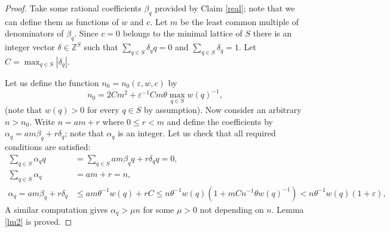 \documentclass[10pt,a4paper]{amsart}
\newcommand{\Z}{\mathbb Z}
\renewcommand{\le}{\leqslant}
\begin{document}
\begin{proof}
Take some rational coefficients $\beta_q$ provided by Claim \ref{real}; note that we can define them as functions of $w$ and $c$. Let $m$ be the least common multiple of denominators of $\beta_q$.
Since $c=0$ belongs to the minimal lattice of $S$ there is an integer vector $\delta \in \Z^S$ such that $\sum_{q \in S} \delta_q q = 0$ and $\sum_{q \in S} \delta_q = 1$. Let $C = \max_{q \in S} |\delta_q|$. 

Let us define the function $n_0 = n_0(\varepsilon, w, c)$ by
$$
n_0 = 2Cm^2 + \varepsilon^{-1} Cm\theta \max_{q\in S} w(q)^{-1}, 
$$
(note that $w(q) > 0$ for every $q \in S$ by assumption). Now consider an arbitrary $n > n_0$. Write $n = am+r$ where $0 \le r < m$ and define the coefficients by $\alpha_q = a m \beta_q + r \delta_q$; note that $\alpha_q$ is an integer.
Let us check that all required conditions are satisfied:
\begin{align*}
    \sum_{q \in S} \alpha_q q &= \sum_{q \in S} am\beta_q q + r \delta_q q = 0, \\
    \sum_{q \in S} \alpha_q &= am+r = n, \\
    \alpha_q = am\beta_q + r \delta_q &\le am \theta^{-1} w(q) + rC \le n \theta^{-1} w(q) (1 + mC n^{-1} \theta w(q)^{-1}) < n\theta^{-1} w(q) (1 + \varepsilon),
\end{align*}
A similar computation gives $\alpha_q > \mu n$ for some $\mu > 0$ not depending on $n$. Lemma \ref{lm2} is proved.
\end{proof}
\end{document}
